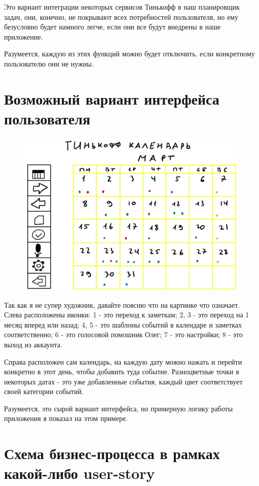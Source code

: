 \documentclass[a4paper,12pt]{article} %
\begin{document}
Это вариант интеграции некоторых сервисов Тинькофф в наш планировщик задач, они, конечно, не покрывают всех потребностей пользователя, но ему безусловно будет намного легче, если они все будут внедрены в наше приложение.

Разумеется, каждую из этих функций можно будет отключить, если конкретному пользователю они не нужны.

\section*{Возможный вариант интерфейса пользователя}

\begin{figure}[h!]
\center
\includegraphics[scale=0.2]{Interface}
\end{figure}

Так как я не супер художник, давайте поясню что на картинке что означает. Слева расположены иконки: 1 - это переход к заметкам; 2, 3 - это переход на 1 месяц вперед или назад; 4, 5 - это шаблоны событий в календаре и заметках соответственно; 6 - это голосовой помошник Олег; 7 - это настройки; 8 - это выход из аккаунта.

Справа расположен сам календарь, на каждую дату можно нажать и перейти конкретно в этот день, чтобы добавить туда событие. Разноцветные точки в некоторых датах - это уже добавленные события, каждый цвет соответствует своей категории событий.

Разумеется, это сырой вариант интерфейса, но примерную логику работы приложения я показал на этом примере.

\newpage

\section*{Схема бизнес-процесса в рамках какой-либо user-story}
\end{document}
